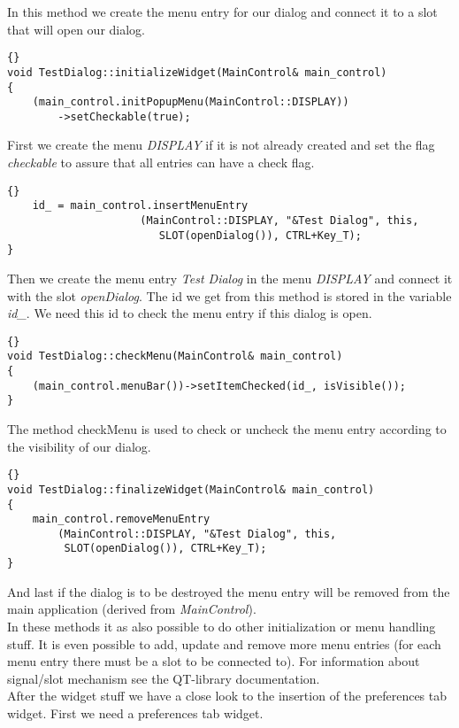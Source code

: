 In this method we create the menu entry for our dialog and connect it to a slot
that will open our dialog.

\begin{lstlisting}{}
void TestDialog::initializeWidget(MainControl& main_control)
{
	(main_control.initPopupMenu(MainControl::DISPLAY))
		->setCheckable(true);
\end{lstlisting}

First we create the menu {\em DISPLAY} if it is not already created and set
the flag {\em checkable} to assure that all entries can have a check flag.

\begin{lstlisting}{}
	id_ = main_control.insertMenuEntry
					 (MainControl::DISPLAY, "&Test Dialog", this,
						SLOT(openDialog()), CTRL+Key_T);   
}
\end{lstlisting}

Then we create the menu entry {\em Test Dialog} in the menu {\em DISPLAY}
and connect it with the slot {\em openDialog}. The id we get from this method is
stored in the variable {\em id\_}. We need this id to check the menu entry if
this dialog is open.

\begin{lstlisting}{}
void TestDialog::checkMenu(MainControl& main_control)
{
	(main_control.menuBar())->setItemChecked(id_, isVisible());
}
\end{lstlisting}

The method checkMenu is used to check or uncheck the menu entry according to the
visibility of our dialog.

\begin{lstlisting}{}
void TestDialog::finalizeWidget(MainControl& main_control)
{
	main_control.removeMenuEntry
		(MainControl::DISPLAY, "&Test Dialog", this,
		 SLOT(openDialog()), CTRL+Key_T);   
}
\end{lstlisting}

And last if the dialog is to be destroyed the menu entry will be removed from
the main application (derived from {\em MainControl}).\\

In these methods it as also possible to do other initialization or menu handling stuff.
It is even possible to add, update and remove more menu entries (for each menu entry
there must be a slot to be connected to).
For information about signal/slot mechanism see the QT-library documentation.\\

After the widget stuff we have a close look to the insertion of the preferences tab widget.
First we need a preferences tab widget.

